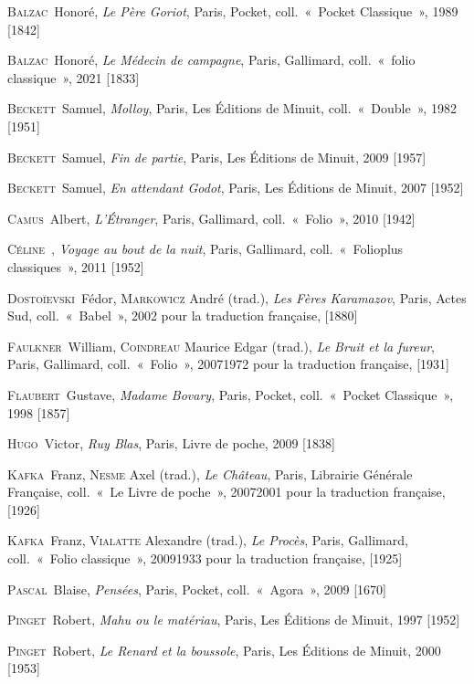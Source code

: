 \documentclass[12pt, a4paper]{article}
\begin{document}
        
        \textsc{Balzac}~Honoré, \textit{Le Père Goriot}, Paris, Pocket, coll.~«~Pocket Classique~», 1989 [1842]\par 
    \textsc{Balzac}~Honoré, \textit{Le Médecin de campagne}, Paris, Gallimard, coll.~«~folio classique~», 2021 [1833]\par 
    \textsc{Beckett}~Samuel, \textit{Molloy}, Paris, Les Éditions de Minuit, coll.~«~Double~», 1982 [1951]\par 
    \textsc{Beckett}~Samuel, \textit{Fin de partie}, Paris, Les Éditions de Minuit, 2009 [1957]\par 
    \textsc{Beckett}~Samuel, \textit{En attendant Godot}, Paris, Les Éditions de Minuit, 2007 [1952]\par 
    \textsc{Camus}~Albert, \textit{L'Étranger}, Paris, Gallimard, coll.~«~Folio~», 2010 [1942]\par 
    \textsc{Céline}~, \textit{Voyage au bout de la nuit}, Paris, Gallimard, coll.~«~Folioplus classiques~», 2011 [1952]\par 
    \textsc{Dostoïevski}~Fédor, \textsc{Markowicz} André (trad.), \textit{Les Fères Karamazov}, Paris, Actes Sud, coll.~«~Babel~», 2002 pour la traduction française,  [1880]\par 
    \textsc{Faulkner}~William, \textsc{Coindreau} Maurice Edgar (trad.), \textit{Le Bruit et la fureur}, Paris, Gallimard, coll.~«~Folio~», 20071972 pour la traduction française,  [1931]\par 
    \textsc{Flaubert}~Gustave, \textit{Madame Bovary}, Paris, Pocket, coll.~«~Pocket Classique~», 1998 [1857]\par 
    \textsc{Hugo}~Victor, \textit{Ruy Blas}, Paris, Livre de poche, 2009 [1838]\par 
    \textsc{Kafka}~Franz, \textsc{Nesme} Axel (trad.), \textit{Le Château}, Paris, Librairie Générale Française, coll.~«~Le Livre de poche~», 20072001 pour la traduction française,  [1926]\par 
    \textsc{Kafka}~Franz, \textsc{Vialatte} Alexandre (trad.), \textit{Le Procès}, Paris, Gallimard, coll.~«~Folio classique~», 20091933 pour la traduction française,  [1925]\par 
    \textsc{Pascal}~Blaise, \textit{Pensées}, Paris, Pocket, coll.~«~Agora~», 2009 [1670]\par 
    \textsc{Pinget}~Robert, \textit{Mahu ou le matériau}, Paris, Les Éditions de Minuit, 1997 [1952]\par 
    \textsc{Pinget}~Robert, \textit{Le Renard et la boussole}, Paris, Les Éditions de Minuit, 2000 [1953]\par 
\end{document}
